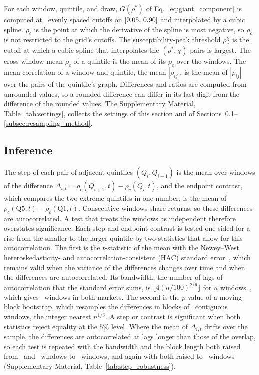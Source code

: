 \documentclass[a4paper,fleqn]{cas-sc}
\begin{document}
For each window, quintile, and draw, $G(\rho^*)$ of Eq.~\eqref{eq:giant_component} is computed at \rhoGridPoints\ evenly spaced cutoffs on $[0.05,\,0.90]$ and interpolated by a cubic spline. $\rho_c$ is the point at which the derivative of the spline is most negative, so $\rho_c$ is not restricted to the grid's cutoffs. The susceptibility-peak threshold $\rho_c^{\chi}$ is the cutoff at which a cubic spline that interpolates the $(\rho^*, \chi)$ pairs is largest. The cross-window mean $\bar\rho_c$ of a quintile is the mean of its $\rho_c$ over the windows. The mean correlation of a window and quintile, the mean $|\rho_{ij}|$, is the mean of $|\rho_{ij}|$ over the pairs of the quintile's graph. Differences and ratios are computed from unrounded values, so a rounded difference can differ in its last digit from the difference of the rounded values. The Supplementary Material, Table~\ref{tab:settings}, collects the settings of this section and of Sections~\ref{subsec:inference}--\ref{subsec:resampling_method}.

\subsection{Inference}\label{subsec:inference}

The step of each pair of adjacent quintiles $(Q_i, Q_{i+1})$ is the mean over windows of the difference $\Delta_{i,t} = \rho_c(Q_{i+1}, t) - \rho_c(Q_i, t)$, and the endpoint contrast, which compares the two extreme quintiles in one number, is the mean of $\rho_c(\text{Q5}, t) - \rho_c(\text{Q1}, t)$. Consecutive windows share returns, so these differences are autocorrelated. A test that treats the windows as independent therefore overstates significance. Each step and endpoint contrast is tested one-sided for a rise from the smaller to the larger quintile by two statistics that allow for this autocorrelation. The first is the $t$-statistic of the mean with the Newey--West heteroskedasticity- and autocorrelation-consistent (HAC) standard error~\citep{newey1987simple}, which remains valid when the variance of the differences changes over time and when the differences are autocorrelated. Its bandwidth, the number of lags of autocorrelation that the standard error sums, is $\lfloor 4(n/100)^{2/9} \rfloor$ for $n$ windows~\citep{newey1994automatic}, which gives \nwLagHeadline\ windows in both markets. The second is the $p$-value of a moving-block bootstrap, which resamples the differences in blocks of \blockBootLenHeadline\ contiguous windows, the integer nearest $n^{1/3}$. A step or contrast is significant when both statistics reject equality at the $5\%$ level. Where the mean of $\Delta_{i,t}$ drifts over the sample, the differences are autocorrelated at lags longer than those of the overlap, so each test is repeated with the bandwidth and the block length both raised from \nwLagHeadline\ and \blockBootLenHeadline\ windows to \bwShort\ windows, and again with both raised to \bwLong\ windows (Supplementary Material, Table~\ref{tab:step_robustness}).
\end{document}
